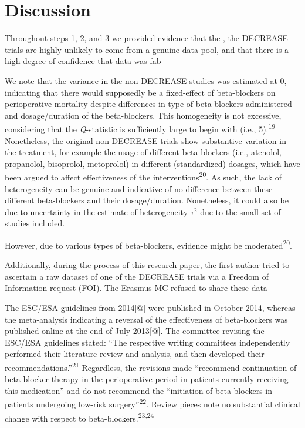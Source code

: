 \documentclass[]{article}
\begin{document}
\section{Discussion}\label{discussion}

Throughout steps 1, 2, and 3 we provided evidence that the , the
DECREASE trials are highly unlikely to come from a genuine data pool,
and that there is a high degree of confidence that data was fab

We note that the variance in the non-DECREASE studies was estimated at
0, indicating that there would supposedly be a fixed-effect of
beta-blockers on perioperative mortality despite differences in type of
beta-blockers administered and dosage/duration of the beta-blockers.
This homogeneity is not excessive, considering that the
\emph{Q}-statistic is sufficiently large to begin with (i.e.,
5).\textsuperscript{19} Nonetheless, the original non-DECREASE trials
show substantive variation in the treatment, for example the usage of
different beta-blockers (i.e., atenolol, propanolol, bisoprolol,
metoprolol) in different (standardized) dosages, which have been argued
to affect effectiveness of the interventions\textsuperscript{20}. As
such, the lack of heterogeneity can be genuine and indicative of no
difference between these different beta-blockers and their
dosage/duration. Nonetheless, it could also be due to uncertainty in the
estimate of heterogeneity \(\tau^2\) due to the small set of studies
included.

However, due to various types of beta-blockers, evidence might be
moderated\textsuperscript{20}.

Additionally, during the process of this research paper, the first
author tried to ascertain a raw dataset of one of the DECREASE trials
via a Freedom of Information request (FOI). The Erasmus MC refused to
share these data

The ESC/ESA guidelines from 2014{[}@{]} were published in October 2014,
whereas the meta-analysis indicating a reversal of the effectiveness of
beta-blockers was published online at the end of July 2013{[}@{]}. The
committee revising the ESC/ESA guidelines stated: ``The respective
writing committees independently performed their literature review and
analysis, and then developed their
recommendations.''\textsuperscript{21} Regardless, the revisions made
``recommend continuation of beta-blocker therapy in the perioperative
period in patients currently receiving this medication'' and do not
recommend the ``initiation of beta-blockers in patients undergoing
low-risk surgery''\textsuperscript{22}. Review pieces note no
substantial clinical change with respect to
beta-blockers.\textsuperscript{23,24}
\end{document}
